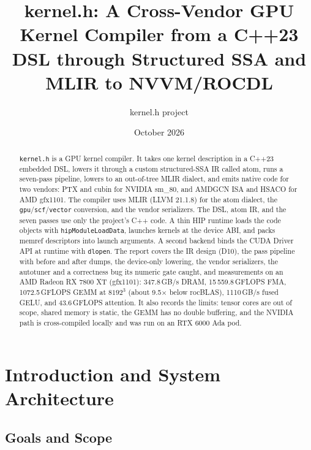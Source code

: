 \documentclass[10pt,twoside]{article}
\title{\textbf{kernel.h}: A Cross-Vendor GPU Kernel Compiler from a C++23 DSL through Structured SSA and MLIR to NVVM/ROCDL}
\author{kernel.h project}
\date{October 2026}
\begin{document}
\pagestyle{empty}

\maketitle

\begin{abstract}
\noindent
\texttt{kernel.h} is a GPU kernel compiler. It takes one kernel description in a C++23
embedded DSL, lowers it through a custom structured-SSA IR called atom, runs a seven-pass
pipeline, lowers to an out-of-tree MLIR dialect, and emits native code for two vendors: PTX
and cubin for NVIDIA sm\_80, and AMDGCN ISA and HSACO for AMD gfx1101. The compiler uses MLIR
(LLVM 21.1.8) for the atom dialect, the \texttt{gpu}/\texttt{scf}/\texttt{vector} conversion,
and the vendor serializers. The DSL, atom IR, and the seven passes use only the project's C++
code. A thin HIP runtime loads the code objects with \texttt{hipModuleLoadData}, launches
kernels at the device ABI, and packs memref descriptors into launch arguments. A second
backend binds the CUDA Driver API at runtime with \texttt{dlopen}. The report covers the IR
design (D10), the pass pipeline with before and after dumps, the device-only lowering, the
vendor serializers, the autotuner and a correctness bug its numeric gate caught, and
measurements on an AMD Radeon RX 7800 XT (gfx1101): 347.8\,GB/s DRAM, 15\,559.8\,GFLOPS FMA,
1072.5\,GFLOPS GEMM at $8192^3$ (about 9.5$\times$ below rocBLAS), 1110\,GB/s fused GELU,
and 43.6\,GFLOPS attention. It also records the limits: tensor cores are out of scope, shared
memory is static, the GEMM has no double buffering, and the NVIDIA path is cross-compiled
locally and was run on an RTX 6000 Ada pod.
\end{abstract}
\thispagestyle{empty}

\clearpage
\thispagestyle{empty}
\tableofcontents
\clearpage
\restoregeometry
\floraoff
\pagestyle{plain}

\section{Introduction and System Architecture}
\label{sec:intro}

\subsection{Goals and Scope}
\label{sec:goals}
\end{document}
